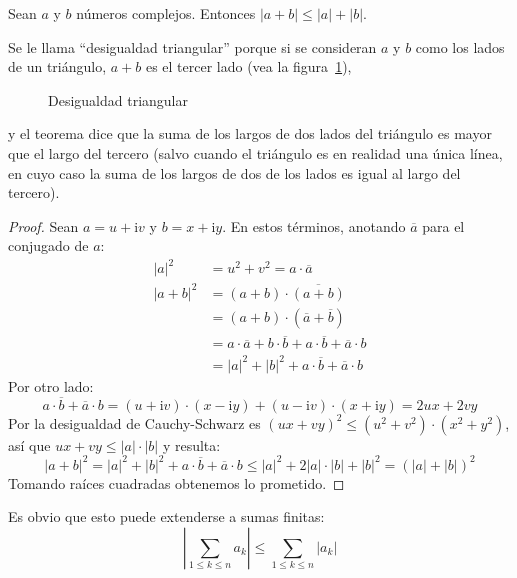   \begin{theorem}
    \label{theo:desigualdad-triangular}
    Sean \(a\) y \(b\) números complejos.
    Entonces
      \mbox{\(\lvert a + b \rvert
		\le \lvert a \rvert + \lvert b \rvert\)}.
  \end{theorem}
  Se le llama ``desigualdad triangular'' porque
  si se consideran \(a\) y \(b\) como los lados de un triángulo,
  \(a + b\) es el tercer lado
  (vea la figura~\ref{fig:triangle}),
  \begin{figure}[htbp]
    \centering
    \caption{Desigualdad triangular}
    \label{fig:triangle}
  \end{figure}
  y el teorema dice
  que la suma de los largos de dos lados del triángulo
  es mayor que el largo del tercero
  (salvo cuando el triángulo es en realidad una única línea,
   en cuyo caso la suma de los largos de dos de los lados
   es igual al largo del tercero).
   \begin{proof}
     Sean \(a = u + \mathrm{i} v\) y \(b = x + \mathrm{i} y\).
     En estos términos,
     anotando \(\overline{a}\) para el conjugado de \(a\):
     \begin{align*}
       \lvert a \rvert^2
	 &= u^2 + v^2
	  = a \cdot \overline{a} \\
       \lvert a + b \rvert^2
	 &= (a + b) \cdot \overline{(a + b)} \\
	 &= (a + b) \cdot (\overline{a} + \overline{b}) \\
	 &= a \cdot \overline{a}
	     + b \cdot \overline{b}
	     + a \cdot \overline{b}
	     + \overline{a} \cdot b \\
	 &= \lvert a \rvert^2 + \lvert b \rvert^2
	     + a \cdot \overline{b}
	     + \overline{a} \cdot b
     \end{align*}
     Por otro lado:
     \begin{equation*}
       a \cdot \overline{b} + \overline{a} \cdot b
	 = (u + \mathrm{i} v) \cdot (x - \mathrm{i} y)
	     + (u - \mathrm{i} v) \cdot (x + \mathrm{i} y)
	 = 2 u x + 2 v y
     \end{equation*}
     Por la desigualdad de Cauchy-Schwarz es
     \((u x + v y)^2 \le (u^2 + v^2) \cdot (x^2 + y^2)\),
     así que \(u x + v y \le \lvert a \rvert \cdot \lvert b \rvert\)
     y resulta:
     \begin{equation*}
       \lvert a + b \rvert^2
	 = \lvert a \rvert^2 + \lvert b \rvert^2
	    + a \cdot \overline{b}
	    + \overline{a} \cdot b
	 \le \lvert a \rvert^2
	    + 2 \lvert a \rvert \cdot \lvert b \rvert
	    + \lvert b \rvert^2
	 = \left(\lvert a \rvert + \lvert b \rvert\right)^2
     \end{equation*}
     Tomando raíces cuadradas obtenemos lo prometido.
   \end{proof}
   Es obvio que esto puede extenderse a sumas finitas:
   \begin{equation}
     \label{eq:triangle-inequality-sum}
     \left\lvert \sum_{1 \le k \le n} a_k \right\rvert
       \le \sum_{1 \le k \le n} \lvert a_k \rvert
   \end{equation}

